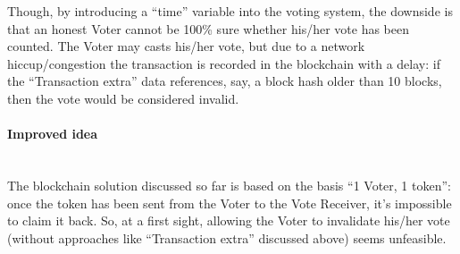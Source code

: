 \documentclass[10pt, letterpaper]{article}
\newcommand{\subsubsubsection}[1]{\paragraph{#1}\mbox{}\\}
\begin{document}
Though, by introducing a “time” variable into the voting system, the downside is that an honest Voter cannot be 100\% sure whether his/her vote has been counted. The Voter may casts his/her vote, but due to a network hiccup/congestion the transaction is recorded in the blockchain with a delay: if the “Transaction extra” data references, say, a block hash older than 10 blocks, then the vote would be considered invalid.
\bigskip

\subsubsubsection{Improved idea}
The blockchain solution discussed so far is based on the basis “1 Voter, 1 token”: once the token has been sent from the Voter to the Vote Receiver, it’s impossible to claim it back. So, at a first sight, allowing the Voter to invalidate his/her vote (without approaches like “Transaction extra” discussed above) seems unfeasible.
\bigskip
\end{document}
